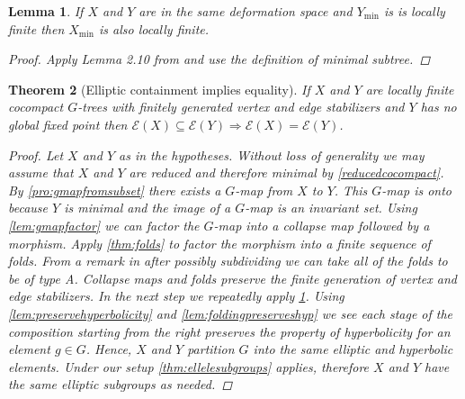 \documentclass[12pt,parskip=full]{report}
\theoremstyle{plain}
\newtheorem{thm}{Theorem}[section]
\newtheorem{lem}[thm]{Lemma}
\theoremstyle{definition}
\begin{document}
\begin{lem}
    \label{lem:pullbacklocallyfinite}
    If \(X\) and \(Y\) are in the same deformation space and \(Y_\text{min}\) is is locally finite then \(X_\text{min}\) is also locally finite.
    \begin{proof}
        Apply Lemma 2.10 from \cite{draftpaper} and use the definition of minimal subtree.
    \end{proof}
\end{lem}


\begin{thm}
    [Elliptic containment implies equality]
    \label{thm:ellipticimpliesequality} 
    If \(X\) and \(Y\) are locally finite cocompact \(G\)-trees with finitely generated vertex and edge stabilizers and \(Y\) has no global fixed point then \(\mathcal{E}(X) \subseteq \mathcal{E}(Y) \Longrightarrow \mathcal{E}(X) = \mathcal{E}(Y) \). 
\begin{proof}

    Let \(X\) and \(Y\) as in the hypotheses. Without loss of generality we may assume that \(X\) and \(Y\) are reduced and therefore minimal by \ref{reducedcocompact}. By \ref{pro:gmapfromsubset} there exists a \(G\)-map from \(X\) to \(Y\). This \(G\)-map is onto because \(Y\) is minimal and the image of a \(G\)-map is an invariant set. Using \ref{lem:gmapfactor} we can factor the \(G\)-map into a collapse map followed by a morphism. Apply \ref{thm:folds} to factor the morphism into a finite sequence of folds. From a remark in \cite{boundingcomplexity} after possibly subdividing we can take all of the folds to be of type A. Collapse maps and folds preserve the finite generation of vertex and edge stabilizers. In the next step we repeatedly apply \ref{lem:pullbacklocallyfinite}. Using \ref{lem:preservehyperbolicity} and \ref{lem:foldingpreserveshyp} we see each stage of the composition starting from the right preserves the property of hyperbolicity for an element \(g\in G\).  Hence, \(X\) and \(Y\) partition \(G\) into the same elliptic and hyperbolic elements. Under our setup \ref{thm:ellelesubgroups} applies, therefore \(X\) and \(Y\) have the same elliptic subgroups as needed.
\end{proof}
\end{thm}
\end{document}
